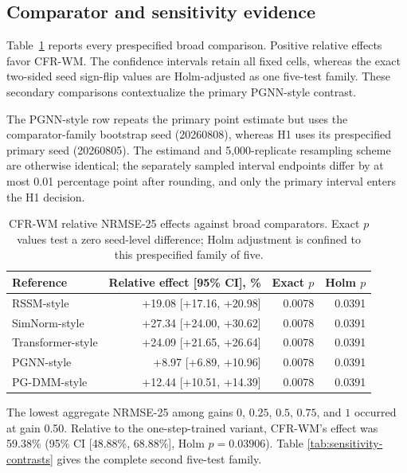 \documentclass[pdflatex,sn-basic]{sn-jnl}
\newcommand{\BestGain}{0.50}
\newcommand{\OneStepImprovement}{59.38}
\newcommand{\OneStepRelativeCILow}{48.88}
\newcommand{\OneStepRelativeCIHigh}{68.88}
\newcommand{\OneStepHolmP}{0.03906}
\begin{document}
\subsection{Comparator and sensitivity evidence}

Table~\ref{tab:comparator-contrasts} reports every prespecified broad
comparison. Positive relative effects favor CFR-WM. The confidence intervals
retain all fixed cells, whereas the exact two-sided seed sign-flip values are
Holm-adjusted as one five-test family. These secondary comparisons contextualize
the primary PGNN-style contrast.

The PGNN-style row repeats the primary point estimate but uses the
comparator-family bootstrap seed (20260808), whereas H1 uses its prespecified
primary seed (20260805). The estimand and 5,000-replicate resampling scheme are
otherwise identical; the separately sampled interval endpoints differ by at
most 0.01 percentage point after rounding, and only the primary interval enters
the H1 decision.

\begin{table}[t]
\centering
\caption{CFR-WM relative NRMSE-25 effects against broad comparators. Exact
$p$ values test a zero seed-level difference; Holm adjustment is confined to
this prespecified family of five.}
\label{tab:comparator-contrasts}
\begin{tabular}{lrrr}
\toprule
Reference & Relative effect [95\% CI], \% & Exact $p$ & Holm $p$ \\
\midrule
RSSM-style & +19.08 [+17.16, +20.98] & 0.0078 & 0.0391 \\
SimNorm-style & +27.34 [+24.00, +30.62] & 0.0078 & 0.0391 \\
Transformer-style & +24.09 [+21.65, +26.64] & 0.0078 & 0.0391 \\
PGNN-style & +8.97 [+6.89, +10.96] & 0.0078 & 0.0391 \\
PG-DMM-style & +12.44 [+10.51, +14.39] & 0.0078 & 0.0391 \\
\bottomrule
\end{tabular}
\end{table}

The lowest aggregate NRMSE-25 among gains $0$, $0.25$, $0.5$, $0.75$, and $1$
occurred at gain \BestGain. Relative to the one-step-trained variant, CFR-WM's
effect was \OneStepImprovement\% (95\% CI [\OneStepRelativeCILow\%,
\OneStepRelativeCIHigh\%], Holm $p=\OneStepHolmP$). Table
\ref{tab:sensitivity-contrasts} gives the complete second five-test family.
\end{document}
